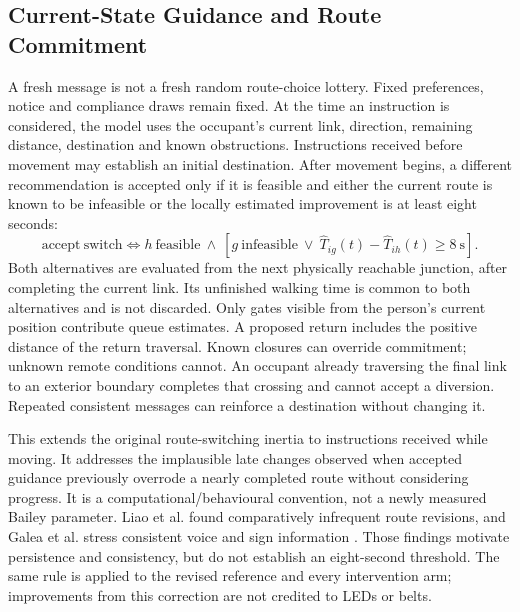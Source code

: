 \documentclass[11pt,a4paper]{article}
\begin{document}


\subsection{Current-State Guidance and Route Commitment}\label{sec:commitment}

A fresh message is not a fresh random route-choice lottery. Fixed preferences, notice and compliance draws remain fixed. At the time an instruction is considered, the model uses the occupant's current link, direction, remaining distance, destination and known obstructions. Instructions received before movement may establish an initial destination. After movement begins, a different recommendation is accepted only if it is feasible and either the current route is known to be infeasible or the locally estimated improvement is at least eight seconds:
\begin{equation}\label{eq:guidance-commitment}
\mathrm{accept\ switch}\iff h\ \mathrm{feasible}\ \land\
\left[g\ \mathrm{infeasible}\ \lor\ \widehat T_{ig}(t)-\widehat T_{ih}(t)\geq8\ \mathrm{s}\right].
\end{equation}
Both alternatives are evaluated from the next physically reachable junction, after completing the current link. Its unfinished walking time is common to both alternatives and is not discarded. Only gates visible from the person's current position contribute queue estimates. A proposed return includes the positive distance of the return traversal. Known closures can override commitment; unknown remote conditions cannot. An occupant already traversing the final link to an exterior boundary completes that crossing and cannot accept a diversion. Repeated consistent messages can reinforce a destination without changing it.

This extends the original route-switching inertia to instructions received while moving. It addresses the implausible late changes observed when accepted guidance previously overrode a nearly completed route without considering progress. It is a computational/behavioural convention, not a newly measured Bailey parameter. Liao et al. found comparatively infrequent route revisions, and Galea et al. stress consistent voice and sign information \cite{liao,galea2017}. Those findings motivate persistence and consistency, but do not establish an eight-second threshold. The same rule is applied to the revised reference and every intervention arm; improvements from this correction are not credited to LEDs or belts.
\end{document}
